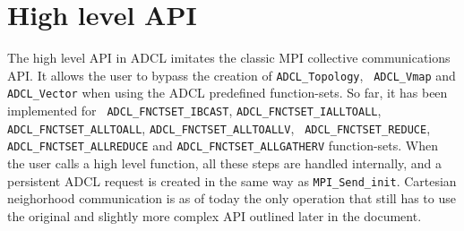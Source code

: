 \section{High level API}


The high level API in ADCL imitates the classic MPI collective communications
API. It allows the user to bypass the creation of {\tt ADCL\_Topology}, {\tt
 ADCL\_Vmap} and {\tt ADCL\_Vector} when using the ADCL predefined
function-sets. So far, it has been implemented for {\tt
  ADCL\_FNCTSET\_IBCAST}, {\tt ADCL\_FNCTSET\_IALLTOALL}, {\tt
  ADCL\_FNCTSET\_ALLTOALL}, {\tt ADCL\_FNCTSET\_ALLTOALLV}, {\tt
  ADCL\_FNCTSET\_REDUCE}, {\tt ADCL\_FNCTSET\_ALLREDUCE} and 
  {\tt ADCL\_FNCTSET\_ALLGATHERV} function-sets. When the user calls a high
level function, all these steps are handled internally, and a persistent ADCL
request is created in the same way as {\tt MPI\_Send\_init}. Cartesian
neighorhood communication is as of today the only operation that still has to
use the original and slightly more complex API outlined later in the document.

